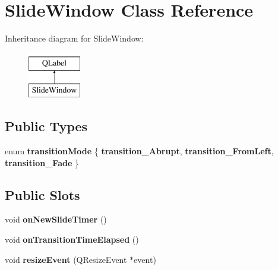 \hypertarget{classSlideWindow}{}\section{Slide\+Window Class Reference}
\label{classSlideWindow}
Inheritance diagram for Slide\+Window\+:\begin{figure}[H]
\begin{center}
\leavevmode
\includegraphics[height=2.000000cm]{d1/d5b/classSlideWindow}
\end{center}
\end{figure}
\subsection*{Public Types}
\begin{DoxyCompactItemize}
\item 
\mbox{\label{classSlideWindow_aa352c11c452cb40358b09ecb2a98cb1a}} 
enum {\bfseries transition\+Mode} \{ {\bfseries transition\+\_\+\+Abrupt}, 
{\bfseries transition\+\_\+\+From\+Left}, 
{\bfseries transition\+\_\+\+Fade}
 \}
\end{DoxyCompactItemize}
\subsection*{Public Slots}
\begin{DoxyCompactItemize}
\item 
\mbox{\label{classSlideWindow_a00d414f2a025498be0e9c3966b078072}} 
void {\bfseries on\+New\+Slide\+Timer} ()
\item 
\mbox{\label{classSlideWindow_a05c8b1e7899c0d3d1577b3a86739a7ca}} 
void {\bfseries on\+Transition\+Time\+Elapsed} ()
\item 
\mbox{\label{classSlideWindow_ab5c3808fd4f64a3763245be30cfde5f2}} 
void {\bfseries resize\+Event} (Q\+Resize\+Event $\ast$event)
\end{DoxyCompactItemize}
